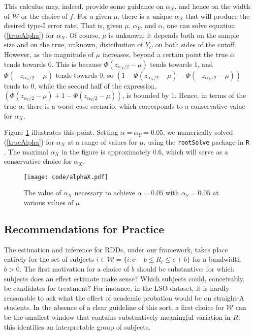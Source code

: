 \documentclass[12pt]{article}
\begin{document}
This calculus may, indeed, provide some guidance on $\alpha_X$, and
hence on the width of $\mathcal{W}$ or the choice of $f$.
For a given $\mu$, there is a unique $\alpha_X$ that will produce the
desired type-I error rate.
That is, given $\mu$, $\alpha_Y$, and $\alpha$, one can solve equation
(\ref{trueAlpha}) for $\alpha_X$.
Of course, $\mu$ is unknown: it depends both on the sample size and on
the true, unknown, distribution of $Y_C$ on both sides of the cutoff.
However, as the magnitude of $\mu$ increases, beyond a certain point
the true $\alpha$ tends towards 0.
This is because $\Phi(z_{\alpha_X/2}-\mu)$ tends towards 1, and
$\Phi(-z_{\alpha_X/2}-\mu)$ tends towards 0, so
$(1-\Phi(z_{\alpha_X/2}-\mu)-\Phi(-z_{\alpha_X/2}-\mu))$ tends to 0,
while the second half of the expression,
$(\Phi(z_{\alpha_Y/2}-\mu)+1-\Phi(z_{\alpha_Y/2}-\mu))$, is bounded by
1.
Hence, in terms of the true $\alpha$, there is a worst-case scenario,
which corresponds to a conservative value for $\alpha_X$.


Figure \ref{alphaX} illustrates this point.
Setting $\alpha=\alpha_Y=0.05$, we numerically solved
(\ref{trueAlpha}) for $\alpha_X$ at a range of values for $\mu$, using
the \verb|rootSolve| package in \verb|R| \citep{soetaert2008practical,soetaert2009rootsolve,Rcite}.
The maximal $\alpha_X$ in the figure is approximately 0.6, which will
serve as a conservative choice for $\alpha_X$.

\begin{figure}
\centering
\texttt{[image: code/alphaX.pdf]}
\label{alphaX}
\caption{The value of $\alpha_X$ necessary to achieve $\alpha=0.05$
  with $\alpha_Y=0.05$ at various values of $\mu$}
\end{figure}

\subsection{Recommendations for Practice}
The estimation and inference for RDDs, under
our framework, takes place entirely for the set of subjects $i\in
\mathcal{W}=\{i: c-b \le R_i \le c+b\}$ for a bandwidth $b>0$.
The first motivation for a choice of $b$ should be substantive: for
which subjects does an effect estimate make sense?
Which subjects could, conceivably, be candidates for treatment?
For instance, in the LSO dataset, it is hardly reasonable to ask what
the effect of academic probation would be on straight-A students.
In the absence of a clear guideline of this sort, a first choice for
$\mathcal{W}$ can be the smallest window that contains substantively
meaningful variation in $R$: this identifies an interpretable group of
subjects.
\end{document}
